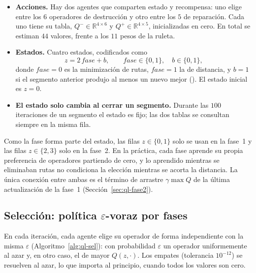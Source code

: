 \begin{itemize}
\item \textbf{Acciones.} Hay dos agentes que comparten estado y recompensa: uno elige entre
los $6$ operadores de destrucción y otro entre los $5$ de reparación. Cada uno tiene su tabla,
$Q^{-}\in\mathbb{R}^{4\times 6}$ y $Q^{+}\in\mathbb{R}^{4\times 5}$, inicializadas en cero. En
total se estiman $44$ valores, frente a los $11$ pesos de la ruleta.
\item \textbf{Estados.} Cuatro estados, codificados como
\begin{equation}
z=2\,\textit{fase}+b,\qquad \textit{fase}\in\{0,1\},\quad b\in\{0,1\},
\label{eq:estado}
\end{equation}
donde $\textit{fase}=0$ es la minimización de rutas, $\textit{fase}=1$ la de distancia, y
$b=1$ si el segmento anterior produjo al menos un nuevo mejor (). El estado
inicial es $z=0$.
\item \textbf{El estado solo cambia al cerrar un segmento.} Durante las $100$ iteraciones de
un segmento el estado es fijo; las dos tablas se consultan siempre en la misma fila.
\end{itemize}

Como la fase forma parte del estado, las filas $z\in\{0,1\}$ solo se usan en la fase~1 y las
filas $z\in\{2,3\}$ solo en la fase~2. En la práctica, cada fase aprende su propia preferencia
de operadores partiendo de cero, y lo aprendido mientras se eliminaban rutas no condiciona la
elección mientras se acorta la distancia. La única conexión entre ambas es el término de
arrastre $\gamma\max Q$ de la última actualización de la fase~1 (Sección~\ref{sec:ql-fase2}).

\subsection{Selección: política \texorpdfstring{$\varepsilon$}{epsilon}-voraz por fases}
\label{sec:ql-sel}

En cada iteración, cada agente elige su operador de forma independiente con la misma
$\varepsilon$ (Algoritmo~\ref{alg:ql-sel}): con probabilidad $\varepsilon$ un operador
uniformemente al azar y, en otro caso, el de mayor $Q(z,\cdot)$. Los empates (tolerancia
$10^{-12}$) se resuelven al azar, lo que importa al principio, cuando todos los valores son
cero.

